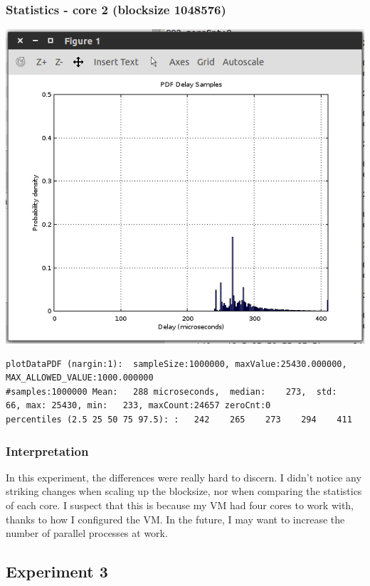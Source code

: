 \documentclass{article}
\begin{document}
\subsubsection{Statistics - core 2 (blocksize 1048576)}

\includegraphics{q3/exp2/core2}

\begin{lstlisting}
plotDataPDF (nargin:1):  sampleSize:1000000, maxValue:25430.000000,  MAX_ALLOWED_VALUE:1000.000000
#samples:1000000 Mean:   288 microseconds,  median:    273,  std:     66, max: 25430, min:   233, maxCount:24657 zeroCnt:0
percentiles (2.5 25 50 75 97.5): :   242    265    273    294    411
\end{lstlisting}

\subsubsection{Interpretation}

In this experiment, the differences were really hard to discern. I didn't notice
any striking changes when scaling up the blocksize, nor when comparing the
statistics of each core. I suspect that this is because my VM had four cores to
work with, thanks to how I configured the VM. In the future, I may want to
increase the number of parallel processes at work.

\subsection{Experiment 3}
\end{document}
